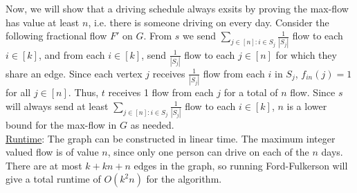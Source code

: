 \documentclass{article}
\begin{document}
Now, we will show that a driving schedule always exsits by proving the max-flow has value at least $n$, i.e. there is someone driving on every day. Consider the following fractional flow $F'$ on $G$. From $s$ we send $\sum_{j \in[n]:i \in S_j} \frac{1}{|S_j|}$ flow to each $i \in [k]$, and from each $i \in [k]$, send $\frac{1}{|S_j|}$ flow to each $j \in [n]$ for which they share an edge. Since each vertex $j$ receives $\frac{1}{|S_j|}$ flow from each $i$ in $S_j$, $f_{in}(j) = 1$ for all $j \in [n]$. Thus, $t$ receives 1 flow from each $j$ for a total of $n$ flow. Since $s$ will always send at least $\sum_{j \in[n]:i \in S_j} \frac{1}{|S_j|}$ flow to each $i \in [k]$, $n$ is a lower bound for the max-flow in $G$ as needed. \\[0.5ex]
\underline{Runtime}: The graph can be constructed in linear time. The maximum integer valued flow is of value $n$, since only one person can drive on each of the $n$ days. There are at most $k + kn + n$ edges in the graph, so running Ford-Fulkerson will give a total runtime of $O(k^2n)$ for the algorithm. 
\end{document}
